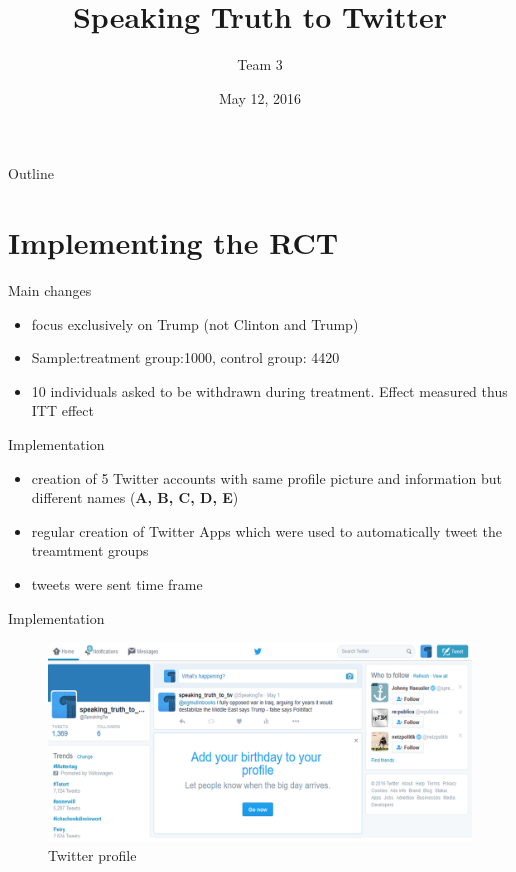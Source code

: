 \documentclass{beamer}
\title[RCT Finding]{Speaking Truth to Twitter}
\author{Team 3}
\institute{Hertie School of Governance}
\date{May 12, 2016}
\begin{document}
\begin{frame}
  \titlepage
\end{frame}

\begin{frame}{Outline}
  \tableofcontents
\end{frame}



\section{Implementing the RCT}
\begin{frame} {Main changes}
	\begin{itemize}
	\item focus exclusively on Trump (not Clinton and Trump) 
	\item Sample:treatment group:1000, control group: 4420 
	\item 10 individuals asked to be withdrawn during treatment. Effect measured thus ITT effect
	\end{itemize}
\end{frame}

\begin{frame}{Implementation}
	\begin{itemize}
	\item creation of 5 Twitter accounts with same 		profile picture and information but different names (\textbf{A, B, C, D, E}) 
	\item regular creation of Twitter Apps which were used to automatically tweet the treamtment groups
	\item tweets were sent time frame
	\end{itemize}
\end{frame}

\begin{frame}{Implementation}
		\begin{figure}
			\begin{centering}
  	\includegraphics[scale=.45]{twitter_page.PNG}
  \caption{Twitter profile}
			\end{centering}
		\end{figure}
\end{frame}
\end{document}
